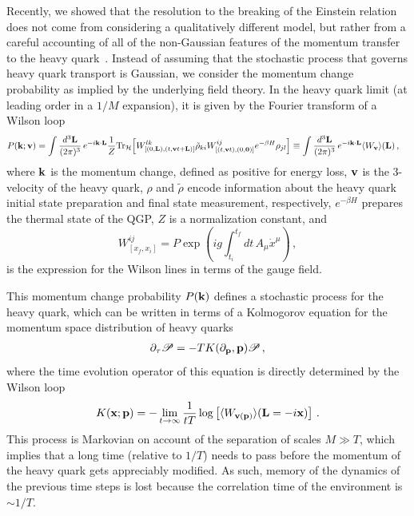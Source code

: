 \documentclass[final,3p,times]{elsarticle}
\begin{document}
Recently, we showed that the resolution to the breaking of the Einstein relation does not come from considering a qualitatively different model, but rather from a careful accounting of all of the non-Gaussian features of the momentum transfer to the heavy quark~\cite{Rajagopal:2025rxr}. Instead of assuming that the stochastic process that governs heavy quark transport is Gaussian, we consider the momentum change probability as implied by the underlying field theory. In the heavy quark limit (at leading order in a $1/M$ expansion), it is given by the Fourier transform of a Wilson loop
\begin{align}
    P({\bf k};{\bf v}) &=  \int \frac{d^3{\bf L}}{(2\pi)^3}  \, e^{-i {\bf k} \cdot {\bf L}  } \frac{1}{Z} {\rm Tr}_{\mathcal{H}} \! \left[ W^{lk}_{[(0, {\bf L}),(t, {\bf v} t + {\bf L} )]} \tilde{\rho}_{ki} W^{ij}_{[(t, {\bf v} t ),(0,{\bf 0})]} e^{-\beta H}  \rho_{jl} \right] \equiv  \int \frac{d^3{\bf L}}{(2\pi)^3} \, e^{-i {\bf k} \cdot {\bf L}  } \langle W_{\bf v} \rangle ({\bf L}) \, , \label{eq:P-from-W}
\end{align}
where ${\bf k}$ is the momentum change, defined as positive for energy loss, ${\bf v}$ is the 3-velocity of the heavy quark, $\rho$ and $\tilde{\rho}$ encode information about the heavy quark initial state preparation and final state measurement, respectively, $e^{-\beta H}$ prepares the thermal state of the QGP, $Z$ is a normalization constant, and 
\begin{equation}
    W^{ij}_{[x_f,x_i]} = P \exp \left( i g \int_{t_i}^{t_f} dt \,  A_{\mu} \dot{x}^\mu \right) \, , \label{eq:wilson-line}
\end{equation}
is the expression for the Wilson lines in terms of the gauge field.

This momentum change probability $P({\bf k})$ defines a stochastic process for the heavy quark, which can be written in terms of a Kolmogorov equation for the momentum space distribution of heavy quarks
\begin{align}
    \partial_\tau \mathscr{P} = - T K(\partial_{\bf p}, {\bf p}) \mathscr{P} \, ,
    \label{eq:Kolmogorov}
\end{align}
where the time evolution operator of this equation is directly determined by the Wilson loop
\begin{equation}
    K({\bf x};{\bf p}) = - \lim_{t \to \infty} \frac{1}{tT} \log \left[ \langle W_{{\bf v}({\bf p})} \rangle({\bf L} = - i {\bf x}) \right] \, .
\end{equation}
This process is Markovian on account of the separation of scales $M \gg T$, which implies that a long time (relative to $1/T$) needs to pass before the momentum of the heavy quark gets appreciably modified. As such, memory of the dynamics of the previous time steps is lost because the correlation time of the environment is $\sim 1/T$.
\end{document}
